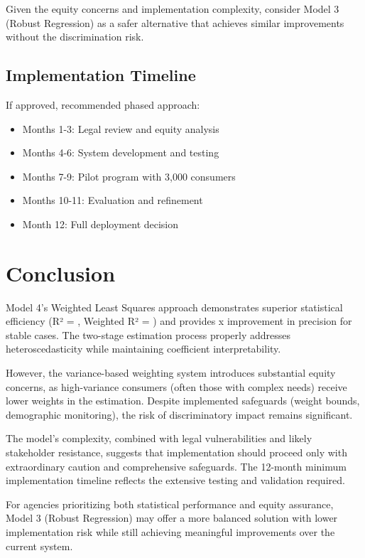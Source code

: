 Given the equity concerns and implementation complexity, consider Model 3 (Robust Regression) as a safer alternative that achieves similar improvements without the discrimination risk.

\subsection{Implementation Timeline}

If approved, recommended phased approach:
\begin{itemize}
    \item Months 1-3: Legal review and equity analysis
    \item Months 4-6: System development and testing
    \item Months 7-9: Pilot program with 3,000 consumers
    \item Months 10-11: Evaluation and refinement
    \item Month 12: Full deployment decision
\end{itemize}

\section{Conclusion}

Model 4's Weighted Least Squares approach demonstrates superior statistical efficiency (R² = \ModelFourRSquaredTest{}, Weighted R² = \ModelFourWeightedRSquared{}) and provides \ModelFourEfficiencyRatio{}x improvement in precision for stable cases. The two-stage estimation process properly addresses heteroscedasticity while maintaining coefficient interpretability.

However, the variance-based weighting system introduces substantial equity concerns, as high-variance consumers (often those with complex needs) receive lower weights in the estimation. Despite implemented safeguards (weight bounds, demographic monitoring), the risk of discriminatory impact remains significant.

The model's complexity, combined with legal vulnerabilities and likely stakeholder resistance, suggests that implementation should proceed only with extraordinary caution and comprehensive safeguards. The 12-month minimum implementation timeline reflects the extensive testing and validation required.

For agencies prioritizing both statistical performance and equity assurance, Model 3 (Robust Regression) may offer a more balanced solution with lower implementation risk while still achieving meaningful improvements over the current system.